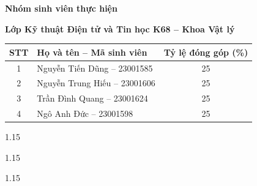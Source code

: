 \documentclass[
12pt,
oneside,
english,
doublespacing,
nolistspacing,
liststotoc,
parskip,
headsepline,
chapterinoneline,
]{HUSdissertation}
\begin{document}
\clearpage


\textbf{Nhóm sinh viên thực hiện}

\vspace{0.3cm}

\textbf{Lớp Kỹ thuật Điện tử và Tin học K68 -- Khoa Vật lý}

\vspace{0.5cm}

\begin{center}
\begin{tabular}{c l c}
\hline
\textbf{STT} & \textbf{Họ và tên -- Mã sinh viên} & \textbf{Tỷ lệ đóng góp (\%)} \\
\hline
1 & Nguyễn Tiến Dũng -- 23001585 & 25\\
2 & Nguyễn Trung Hiếu -- 23001606 & 25\\
3 & Trần Đình Quang -- 23001624 & 25\\
4 & Ngô Anh Đức -- 23001598 & 25\\
\hline
\end{tabular}
\end{center}

\clearpage

\begin{spacing}{1.15}
	\tableofcontents
\end{spacing}

\begin{spacing}{1.15}
	\listoffigures
\end{spacing}

\begin{spacing}{1.15}
	\listoftables
\end{spacing}


\end{document}
